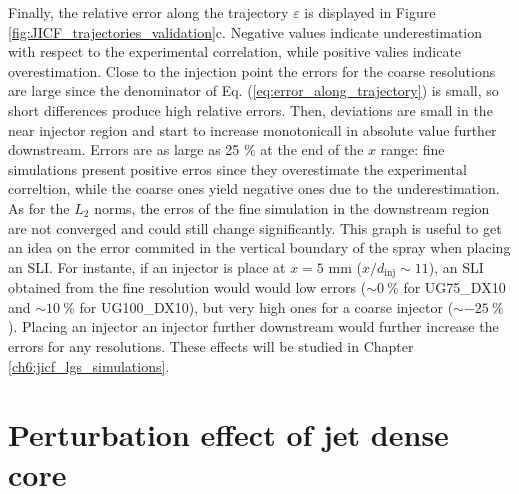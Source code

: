 Finally, the relative error along the trajectory $\varepsilon$ is displayed in Figure \ref{fig:JICF_trajectories_validation}c. Negative values indicate underestimation with respect to the experimental correlation, while positive valies indicate overestimation. Close to the injection point the errors for the coarse resolutions are large since the denominator of Eq. (\ref{eq:error_along_trajectory}) is small, so short differences produce high relative errors. Then, deviations are small in the near injector region and start to increase monotonicall in absolute value further downstream. Errors are as large as 25 $\%$ at the end of the $x$ range: fine simulations present positive erros since they overestimate the experimental correltion, while the coarse ones yield negative ones due to the underestimation. As for the $L_2$ norms, the erros of the fine simulation in the downstream region are not converged and could still change significantly. This graph is useful to get an idea on the error commited in the vertical boundary of the spray when placing an SLI. For instante, if an injector is place at $x = 5$ mm ($x/d_\mathrm{inj} \sim 11$), an SLI obtained from the fine resolution would would low errors ($\sim 0~\%$ for UG75\_DX10 and $\sim 10~\%$ for UG100\_DX10), but very high ones for a coarse injector ($\sim - 25~\%$). Placing an injector an injector further downstream would further increase the errors for  any resolutions. These effects will be studied in Chapter \ref{ch6:jicf_lgs_simulations}.

%

\clearpage

\section{Perturbation effect of jet dense core}
\label{subsec:ch5_dense_core_in_ACLS_simus}

